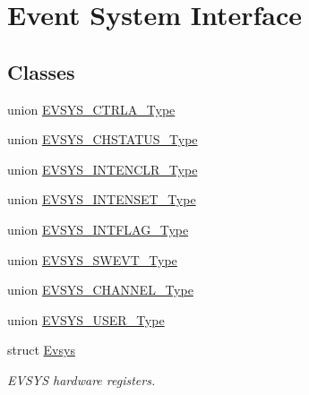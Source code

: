 \hypertarget{group___s_a_m_l21___e_v_s_y_s}{}\section{Event System Interface}
\label{group___s_a_m_l21___e_v_s_y_s}
\subsection*{Classes}
\begin{DoxyCompactItemize}
\item 
union \hyperlink{union_e_v_s_y_s___c_t_r_l_a___type}{E\+V\+S\+Y\+S\+\_\+\+C\+T\+R\+L\+A\+\_\+\+Type}
\item 
union \hyperlink{union_e_v_s_y_s___c_h_s_t_a_t_u_s___type}{E\+V\+S\+Y\+S\+\_\+\+C\+H\+S\+T\+A\+T\+U\+S\+\_\+\+Type}
\item 
union \hyperlink{union_e_v_s_y_s___i_n_t_e_n_c_l_r___type}{E\+V\+S\+Y\+S\+\_\+\+I\+N\+T\+E\+N\+C\+L\+R\+\_\+\+Type}
\item 
union \hyperlink{union_e_v_s_y_s___i_n_t_e_n_s_e_t___type}{E\+V\+S\+Y\+S\+\_\+\+I\+N\+T\+E\+N\+S\+E\+T\+\_\+\+Type}
\item 
union \hyperlink{union_e_v_s_y_s___i_n_t_f_l_a_g___type}{E\+V\+S\+Y\+S\+\_\+\+I\+N\+T\+F\+L\+A\+G\+\_\+\+Type}
\item 
union \hyperlink{union_e_v_s_y_s___s_w_e_v_t___type}{E\+V\+S\+Y\+S\+\_\+\+S\+W\+E\+V\+T\+\_\+\+Type}
\item 
union \hyperlink{union_e_v_s_y_s___c_h_a_n_n_e_l___type}{E\+V\+S\+Y\+S\+\_\+\+C\+H\+A\+N\+N\+E\+L\+\_\+\+Type}
\item 
union \hyperlink{union_e_v_s_y_s___u_s_e_r___type}{E\+V\+S\+Y\+S\+\_\+\+U\+S\+E\+R\+\_\+\+Type}
\item 
struct \hyperlink{struct_evsys}{Evsys}
\begin{DoxyCompactList}\small\item\em E\+V\+S\+Y\+S hardware registers. \end{DoxyCompactList}\end{DoxyCompactItemize}
